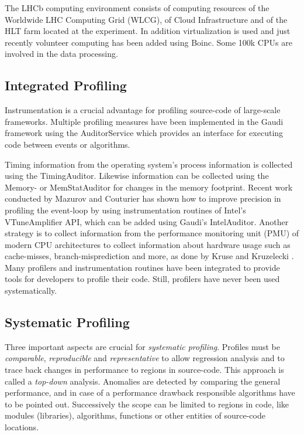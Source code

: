 \documentclass[a4paper]{jpconf}
\begin{document}
The LHCb computing environment consists of computing resources of the Worldwide LHC Computing Grid (WLCG), of Cloud Infrastructure and of the HLT farm located at the experiment. In addition virtualization is used and just recently volunteer computing has been added using Boinc. Some 100k CPUs are involved in the data processing. 

\subsection{Integrated Profiling}
\label{sec:integrated_profiling}

Instrumentation is a crucial advantage for profiling source-code of large-scale frameworks. Multiple profiling measures have been implemented in the Gaudi framework using the AuditorService \cite{status_gaudi} which provides an interface for executing code between events or algorithms.

Timing information from the operating system's process information is collected using the TimingAuditor. Likewise information can be collected using the Memory- or MemStatAuditor for changes in the memory footprint. Recent work \cite{intel_auditor} conducted by Mazurov and Couturier has shown how to improve precision in profiling the event-loop by using instrumentation routines of Intel's VTune\texttrademark Amplifier API, which can be added using Gaudi's IntelAuditor. Another strategy is to collect information from the performance monitoring unit (PMU) of modern CPU architectures to collect information about hardware usage such as cache-misses, branch-misprediction and more, as done by Kruse and Kruzelecki \cite{modular_monitoring}. Many profilers and instrumentation routines have been integrated to provide tools for developers to profile their code. Still, profilers have never been used systematically.

\subsection{Systematic Profiling}
\label{sec:integrated_profiling}

Three important aspects are crucial for \textit{systematic profiling}. Profiles must be \textit{comparable}, \textit{reproducible} and \textit{representative} to allow regression analysis and to trace back changes in performance to regions in source-code. This approach is called a \textit{top-down} analysis. Anomalies are detected by comparing the general performance, and in case of a performance drawback responsible algorithms have to be pointed out. Successively the scope can be limited to regions in code, like modules (libraries), algorithms, functions or other entities of source-code locations.
\end{document}

